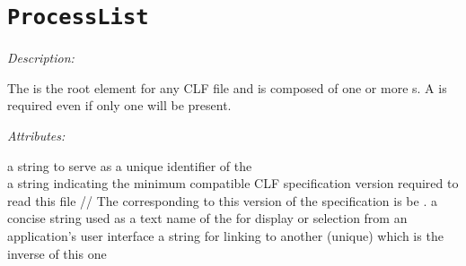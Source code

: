 \section{\texttt{ProcessList}}
\label{sec:processList}

\emph{Description:} \par
The  is the root element for any CLF file and is composed of one or more s.  A  is required even if only one  will be present.  



\emph{Attributes:}
\begin{xmlfields}
    \xmlitem[id][required] a string to serve as a unique identifier of the \\
    \xmlitem[compCLFversion][required] a string indicating the minimum compatible CLF specification version required to read this file //
    The  corresponding to this version of the specification is be .   \xmlitem[name][optional] a concise string used as a text name of the  for display or selection from an application's user interface
    \xmlitem[inverseOf][optional] a string for linking to another   (unique) which is the inverse of this one
\end{xmlfields}

